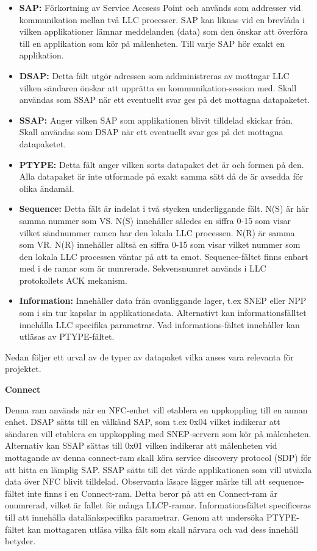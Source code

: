 \documentclass[11pt]{article}
\begin{document}
\begin{itemize}
\item \textbf{SAP:} Förkortning av Service Accsess Point och används som addresser vid kommunikation mellan två LLC processer. SAP kan liknas vid en brevlåda i vilken applikationer lämnar meddelanden (data) som den önskar att överföra till en applikation som kör på målenheten. Till varje SAP hör exakt en applikation. 
\item \textbf{DSAP:} Detta fält utgör adressen som addministreras av mottagar LLC vilken sändaren önskar att upprätta en kommunikation-session med. Skall användas som SSAP när ett eventuellt svar ges på det mottagna datapaketet.
\item \textbf{SSAP:} Anger vilken SAP som applikationen blivit tilldelad skickar från. Skall användas som DSAP när ett eventuellt svar ges på det mottagna datapaketet.
\item \textbf{PTYPE:} Detta fält anger vilken sorts datapaket det är och formen på den. Alla datapaket är inte utformade  på exakt samma sätt då de är avsedda för olika ändamål.
\item \textbf{Sequence:} Detta fält är indelat i två stycken underliggande fält. N(S) är här samma nummer som VS. N(S) innehåller således en siffra 0-15 som visar vilket sändnummer ramen har den lokala LLC processen. N(R) är samma som VR. N(R) innehåller alltså en siffra 0-15 som visar vilket nummer som den lokala LLC processen väntar på att ta emot. Sequence-fältet finns enbart med i de ramar som är numrerade. Sekvensnumret används i LLC protokollets ACK mekanism.
\item \textbf{Information:} Innehåller data från ovanliggande lager, t.ex SNEP eller NPP som i sin tur kapslar in applikationsdata. Alternativt kan informationsfälltet innehålla LLC specifika parametrar. Vad informations-fältet innehåller kan utläsas av PTYPE-fältet.
\end{itemize}

Nedan följer ett urval av de typer av datapaket vilka anses vara relevanta för projektet.

\textbf{Connect}


Denna ram används när en NFC-enhet vill etablera en uppkoppling till en annan enhet. DSAP sätts till en välkänd SAP, som t.ex 0x04 vilket indikerar att sändaren vill etablera en uppkoppling med SNEP-servern som kör på målenheten. Alternativ kan SSAP sättas till 0x01 vilken indikerar att målenheten vid mottagande av denna connect-ram skall köra service discovery protocol (SDP) för att hitta en lämplig SAP. SSAP sätts till det värde applikationen som vill utväxla data över NFC blivit tilldelad. Observanta läsare lägger märke till att sequence-fältet inte finns i en Connect-ram. Detta beror på att en Connect-ram är onumrerad, vilket är fallet för många LLCP-ramar. Informationsfältet specificeras till att innehålla datalänkspecifika parametrar. Genom att undersöka PTYPE-fältet kan mottagaren utläsa vilka fält som skall närvara och vad dess innehåll betyder.
\end{document}

